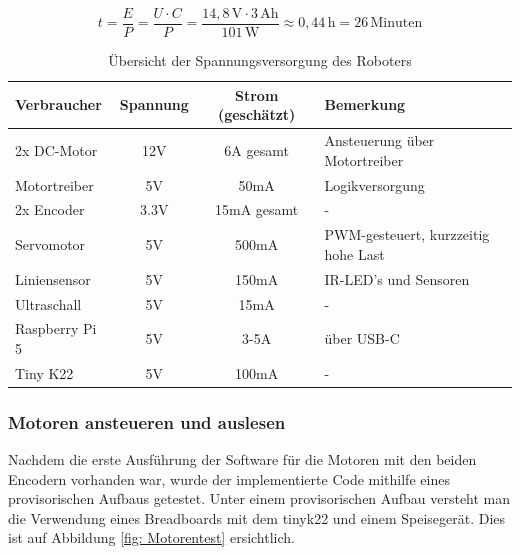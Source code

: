 \[
t = \frac{E}{P} = \frac{U \cdot C}{P} = \frac{14{,}8\,\text{V} \cdot 3\,\text{Ah}}{101\,\text{W}} \approx 0{,}44\,\text{h} = 26\,\text{Minuten}
\]


\newpage

\begin{table}[h!]
\centering
\renewcommand{\arraystretch}{1.3}
\begin{tabular}{@{} l c c l @{}}
\toprule
\textbf{Verbraucher}         & \textbf{Spannung} & \textbf{Strom (geschätzt)} & \textbf{Bemerkung} \\
\midrule
2x DC-Motor                  & 12V              & 6A gesamt               & Ansteuerung über Motortreiber \\

Motortreiber & 5V               &  50mA              & Logikversorgung \\

2x Encoder & 3.3V               &  15mA gesamt             &- \\

Servomotor                   & 5V               &  500mA                 & PWM-gesteuert, kurzzeitig hohe Last \\

Liniensensor         & 5V               &  150mA                  & IR-LED's und Sensoren \\

Ultraschall & 5V               &  15mA              &- \\

Raspberry Pi 5              & 5V               & 3-5A                      & über USB-C \\

Tiny K22             & 5V               & 100mA                      & - \\

\bottomrule
\end{tabular}
\caption{Übersicht der Spannungsversorgung des Roboters}
\label{tab:spannungsversorgung}
\end{table}



\subsubsection{Motoren ansteueren und auslesen}
\label{motoren-encoder}


Nachdem die erste Ausführung der Software für die Motoren mit den beiden Encodern vorhanden war, wurde der implementierte Code mithilfe eines provisorischen Aufbaus getestet. Unter einem provisorischen Aufbau versteht man die Verwendung eines Breadboards mit dem \gls{tinyk22} und einem Speisegerät. Dies ist auf Abbildung \ref{fig: Motorentest} ersichtlich.

